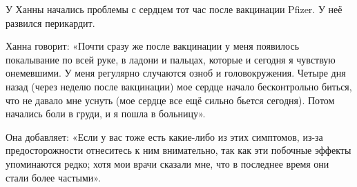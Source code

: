 У Ханны начались проблемы с сердцем тот час после вакцинации Pfizer. У неё
развился перикардит.

Ханна говорит: «Почти сразу же после вакцинации у меня появилось покалывание по
всей руке, в ладони и пальцах, которые и сегодня я чувствую онемевшими. У меня
регулярно случаются озноб и головокружения. Четыре дня назад (через неделю после
вакцинации) мое сердце начало бесконтрольно биться, что не давало мне уснуть
(мое сердце все ещё сильно бьется сегодня). Потом начались боли в груди, и я
пошла в больницу».

Она добавляет: «Если у вас тоже есть какие-либо из этих симптомов, из-за
предосторожности отнеситесь к ним внимательно, так как эти побочные эффекты
упоминаются редко; хотя мои врачи сказали мне, что в последнее время они стали
более частыми».

